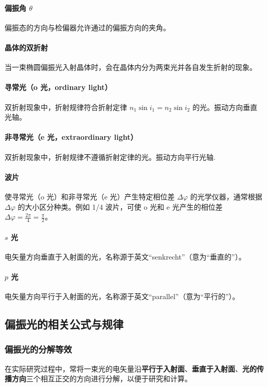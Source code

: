 \documentclass{article}
\begin{document}
	\paragraph{偏振角 \(\theta\)}
	偏振态的方向与检偏器允许通过的偏振方向的夹角。
	
	\paragraph{晶体的双折射}
	当一束椭圆偏振光入射晶体时，会在晶体内分为两束光并各自发生折射的现象。
	
	\paragraph{寻常光（o 光，ordinary light）}
	双折射现象中，折射规律符合折射定律 \(n_1\sin i_1 = n_2\sin i_2\) 的光。振动方向垂直光轴。
	
	\paragraph{非寻常光（e 光，extraordinary light）}
	双折射现象中，折射规律不遵循折射定律的光。振动方向平行光轴.
	
	\paragraph{波片}
	使寻常光（o 光）和非寻常光（e 光）产生特定相位差 \(\Delta\varphi\) 的光学仪器，通常根据 \(\Delta\varphi\) 的大小区分种类。例如 1/4 波片，可使 o 光和 e 光产生的相位差 \(\Delta\varphi=\frac{2\pi}{4}=\frac{\pi}{2}\)。
	
	\paragraph{\(s\) 光}
	电矢量方向垂直于入射面的光，名称源于英文“senkrecht”（意为“垂直的”）。
	
	\paragraph{\(p\) 光}
	电矢量方向平行于入射面的光，名称源于英文“parallel”（意为“平行的”）。
	
	\subsection{偏振光的相关公式与规律}
	\subsubsection{偏振光的分解等效}
	在实际研究过程中，常将一束光的电矢量沿\textbf{平行于入射面}、\textbf{垂直于入射面}、\textbf{光的传播方向}三个相互正交的方向进行分解，以便于研究和计算。
	
\end{document}
